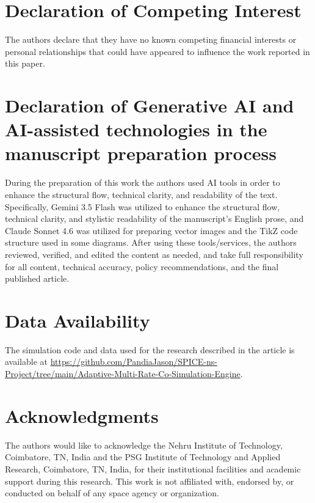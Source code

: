 \documentclass[a4paper,fleqn]{cas-sc}
\begin{document}
\section*{Declaration of Competing Interest}
The authors declare that they have no known competing financial interests or personal relationships that could have appeared to influence the work reported in this paper.

\section*{Declaration of Generative AI and AI-assisted technologies in the manuscript preparation process}
During the preparation of this work the authors used AI tools in order to enhance the structural flow, technical clarity, and readability of the text. Specifically, Gemini 3.5 Flash was utilized to enhance the structural flow, technical clarity, and stylistic readability of the manuscript's English prose, and Claude Sonnet 4.6 was utilized for preparing vector images and the TikZ code structure used in some diagrams. After using these tools/services, the authors reviewed, verified, and edited the content as needed, and take full responsibility for all content, technical accuracy, policy recommendations, and the final published article.

\section*{Data Availability}
The simulation code and data used for the research described in the article is available at \url{https://github.com/PandiaJason/SPICE-ns-Project/tree/main/Adaptive-Multi-Rate-Co-Simulation-Engine}.

\section*{Acknowledgments}
The authors would like to acknowledge the Nehru Institute of Technology, Coimbatore, TN, India and the PSG Institute of Technology and Applied Research, Coimbatore, TN, India, for their institutional facilities and academic support during this research.
This work is not affiliated with, endorsed by, or conducted on behalf of any space agency or organization.
\end{document}

